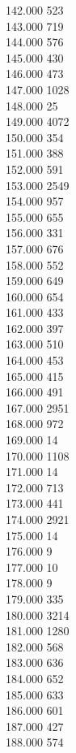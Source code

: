 { 142.000	523 \\
 143.000	719 \\
 144.000	576 \\
 145.000	430 \\
 146.000	473 \\
 147.000	1028 \\
 148.000	25 \\
 149.000	4072 \\
 150.000	354 \\
 151.000	388 \\
 152.000	591 \\
 153.000	2549 \\
 154.000	957 \\
 155.000	655 \\
 156.000	331 \\
 157.000	676 \\
 158.000	552 \\
 159.000	649 \\
 160.000	654 \\
 161.000	433 \\
 162.000	397 \\
 163.000	510 \\
 164.000	453 \\
 165.000	415 \\
 166.000	491 \\
 167.000	2951 \\
 168.000	972 \\
 169.000	14 \\
 170.000	1108 \\
 171.000	14 \\
 172.000	713 \\
 173.000	441 \\
 174.000	2921 \\
 175.000	14 \\
 176.000	9 \\
 177.000	10 \\
 178.000	9 \\
 179.000	335 \\
 180.000	3214 \\
 181.000	1280 \\
 182.000	568 \\
 183.000	636 \\
 184.000	652 \\
 185.000	633 \\
 186.000	601 \\
 187.000	427 \\
 188.000	574 \\
}
